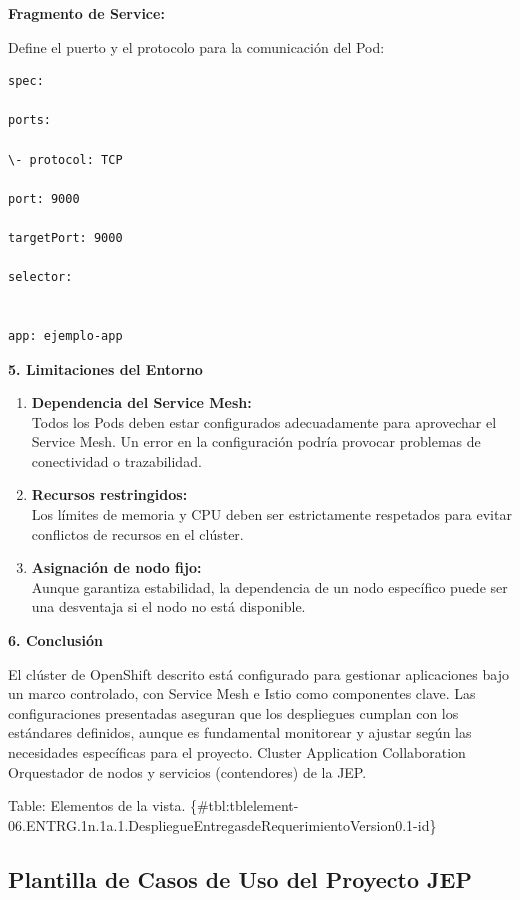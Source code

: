 \documentclass[
  paper=a4,
  ,captions=tableheading
]{scrartcl}
\providecommand{\tightlist}{%
  \setlength{\itemsep}{0pt}\setlength{\parskip}{0pt}}
\begin{document}
\textbf{Fragmento de Service:}

Define el puerto y el protocolo para la comunicación del Pod:

\begin{verbatim}
spec:

ports:

\- protocol: TCP

port: 9000

targetPort: 9000

selector:


app: ejemplo-app
\end{verbatim}

\textbf{5. Limitaciones del Entorno}

\begin{enumerate}
\def\labelenumi{\arabic{enumi}.}
\tightlist
\item
  \textbf{Dependencia del Service Mesh:}\\
  Todos los Pods deben estar configurados adecuadamente para aprovechar
  el Service Mesh. Un error en la configuración podría provocar
  problemas de conectividad o trazabilidad.
\item
  \textbf{Recursos restringidos:}\\
  Los límites de memoria y CPU deben ser estrictamente respetados para
  evitar conflictos de recursos en el clúster.
\item
  \textbf{Asignación de nodo fijo:}\\
  Aunque garantiza estabilidad, la dependencia de un nodo específico
  puede ser una desventaja si el nodo no está disponible.
\end{enumerate}

\textbf{6. Conclusión}

El clúster de OpenShift descrito está configurado para gestionar
aplicaciones bajo un marco controlado, con Service Mesh e Istio como
componentes clave. Las configuraciones presentadas aseguran que los
despliegues cumplan con los estándares definidos, aunque es fundamental
monitorear y ajustar según las necesidades específicas para el proyecto.
\textbar{} \textbar{} Cluster \textbar{} Application Collaboration
\textbar{} Orquestador de nodos y servicios (contendores) de la JEP.
\textbar{}

Table: Elementos de la vista.
\{\#tbl:tblelement-06.ENTRG.1n.1a.1.DespliegueEntregasdeRequerimientoVersion0.1-id\}

\subsection{Plantilla de Casos de Uso del Proyecto
JEP}\label{sec:plantilla-de-casos-de-uso-del-proyecto-jep}
\end{document}
